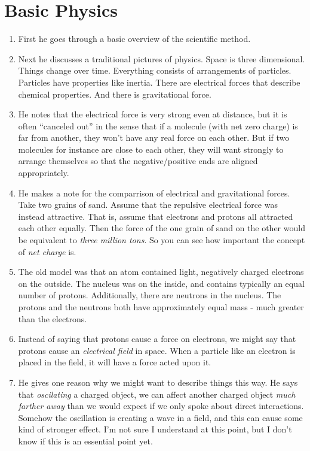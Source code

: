 \section{Basic Physics}

\begin{enumerate}
  \item First he goes through a basic overview of the scientific method.

  \item Next he discusses a traditional pictures of physics. Space is
  three dimensional. Things change over time. Everything consists of
  arrangements of particles. Particles have properties like inertia.
  There are electrical forces that describe chemical properties. And
  there is gravitational force.

  \item He notes that the electrical force is very strong even at
  distance, but it is often ``canceled out'' in the sense that if a
  molecule (with net zero charge) is far from another, they won't have
  any real force on each other. But if two  molecules for
  instance are close to each other, they will want strongly to arrange
  themselves so that the negative/positive ends are aligned
  appropriately.

  \item He makes a note for the comparrison of electrical and
  gravitational forces. Take two grains of sand. Assume that the
  repulsive electrical force was instead attractive. That is, assume
  that electrons and protons all attracted each other equally. Then the
  force of the one grain of sand on the other would be equivalent to
  \emph{three million tons}. So you can see how important the concept of
  \emph{net charge} is.

  \item The old model was that an atom contained light, negatively
  charged electrons on the outside. The nucleus was on the inside, and
  contains typically an equal number of protons. Additionally, there are
  neutrons in the nucleus. The protons and the neutrons both have
  approximately equal mass - much greater than the electrons.

  \item Instead of saying that protons cause a force on electrons, we
  might say that protons cause an \emph{electrical field} in space. When
  a particle like an electron is placed in the field, it will have a
  force acted upon it.

  \item He gives one reason why we might want to describe things this
  way. He says that \emph{oscilating} a charged object, we can affect
  another charged object \emph{much farther away} than we would expect
  if we only spoke about direct interactions. Somehow the oscillation is
  creating a wave in a field, and this can cause some kind of stronger
  effect. I'm not sure I understand at this point, but I don't know if
  this is an essential point yet.


\end{enumerate}
